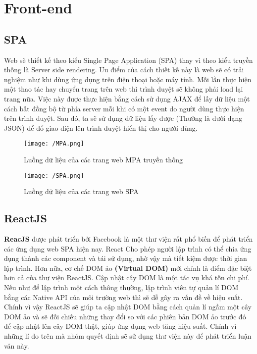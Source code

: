 \section{Front-end}
	\subsection{SPA}
		 Web sẽ thiết kế theo kiểu Single Page Application (SPA) thay vì theo kiểu truyền thống là Server side rendering. Ưu điểm của cách thiết kế này là web sẽ có trải nghiệm như khi dùng ứng dụng trên điện thoại hoặc máy tính. Mỗi lần thực hiện một thao tác hay chuyển trang trên web thì trình duyệt sẽ không phải load lại trang nữa. Việc này được thực hiện bằng cách sử dụng AJAX để lấy dữ liệu một cách bất đồng bộ từ phía server mỗi khi có một event do người dùng thực hiện trên trình duyệt. Sau đó, ta sẽ sử dụng dữ liệu lấy được (Thường là dưới dạng JSON) để đổ giao diện lên trình duyệt hiển thị cho người dùng.
		 
		 \begin{figure}[H]
		 	\texttt{[image: /MPA.png]}
		 	\centering
		 	\linebreak
		 	\caption{Luồng dữ liệu của các trang web MPA truyền thống}
		 \end{figure}
		 
		 \begin{figure}[H]
		 	\texttt{[image: /SPA.png]}
		 	\centering
		 	\linebreak
		 	\caption{Luồng dữ liệu của các trang web SPA}
		 \end{figure}
    
	\subsection{ReactJS}
		\textbf{ReacJS} được phát triển bởi Facebook là một thư viện rất phổ biến để phát triển các ứng dụng web SPA hiện nay. React Cho phép người lập trình có thể chia ứng dụng thành các component và tái sử dụng, nhờ vậy mà tiết kiệm được thời gian lập trình. Hơn nữa, cơ chế DOM ảo \textbf{(Virtual DOM)} mới chính là điểm đặc biệt hơn cả của thư viện ReactJS. Cập nhật cây DOM là một tác vụ khá tốn chi phí. Nếu như để lập trình một cách thông thường, lập trình viên tự quản lí DOM bằng các Native API của môi trường web thì sẽ dễ gây ra vấn đề về hiệu suất. Chính vì vậy ReactJS sẽ giúp ta cập nhật DOM bằng cách quản lí ngầm một cây DOM ảo và sẽ đối chiếu những thay đổi so với các phiên bản DOM ảo trước đó để cập nhật lên cây DOM thật, giúp ứng dụng web tăng hiệu suất. Chính vì những lí do trên mà nhóm quyết định sẽ sử dụng thư viện này để phát triển luận văn này.\\
		
